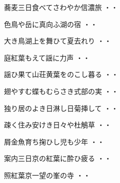 \vspace{0.6cm}
\begin{shiika}蕎麦三日食べてさわやか信濃旅
\hfill{・・}\end{shiika}
\vspace{0.6cm}
\begin{shiika}色鳥や岳に真向ふ湖の宿
\hfill{・・}\end{shiika}
\vspace{0.6cm}
\begin{shiika}大き鳥湖上を舞ひて夏去れり
\hfill{・・}\end{shiika}
\vspace{0.6cm}
\begin{shiika}庭紅葉もえて謡に力声
\hfill{・・}\end{shiika}
\vspace{0.6cm}
\begin{shiika}謡ひ果て山荘黄葉をのこし暮る
\hfill{・・}\end{shiika}
\vspace{0.6cm}
\begin{shiika}翅やすむ蝶もむらさき式部の実
\hfill{・・}\end{shiika}
\vspace{0.6cm}
\begin{shiika}独り居のよき日淋し日菊挿して
\hfill{・・}\end{shiika}
\vspace{0.6cm}
\begin{shiika}疎く住み安けき日々や杜鵤草
\hfill{・・}\end{shiika}
\vspace{0.6cm}
\begin{shiika}屑金魚育ち掬ひし児も少年
\hfill{・・}\end{shiika}
\vspace{0.6cm}
\begin{shiika}案内三日京の紅葉に酔ひ疲る
\hfill{・・}\end{shiika}
\vspace{0.6cm}
\begin{shiika}照紅葉京一望の峯の寺
\hfill{・・}\end{shiika}
